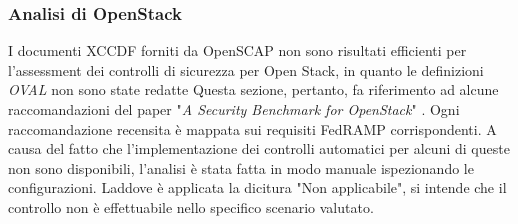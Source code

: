 \documentclass[../main.tex]{subfiles}
\begin{document}
\subsubsection{Analisi di OpenStack}
I documenti XCCDF forniti da OpenSCAP non sono risultati efficienti per l'assessment dei controlli di sicurezza per Open Stack, in quanto le definizioni \textit{OVAL} non sono state redatte
Questa sezione, pertanto, fa riferimento ad alcune raccomandazioni del paper "\textit{A Security Benchmark for OpenStack}" \cite{MyPaper}. Ogni raccomandazione recensita è mappata sui requisiti FedRAMP corrispondenti. A causa del fatto che l'implementazione dei controlli automatici per alcuni di queste non sono disponibili, l'analisi è stata fatta in modo manuale ispezionando le configurazioni.
Laddove è applicata la dicitura "Non applicabile", si intende che il controllo non è effettuabile nello specifico scenario valutato.
\end{document}
